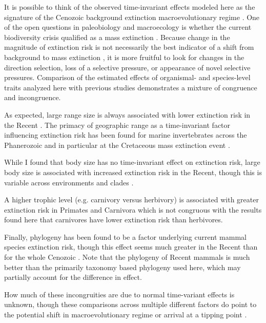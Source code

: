 \documentclass[12pt,letterpaper]{article}
\begin{document}
It is possible to think of the observed time-invariant effects modeled here as the signature of the Cenozoic background extinction macroevolutionary regime \citep{Jablonski1986}. One of the open questions in paleobiology and macroecology is whether the current biodiversity crisis qualified as a mass extinction \citep{Alroy2010,Barnosky2011,Barnosky2012a}. Because change in the magnitude of extinction risk is not necessarily the best indicator of a shift from background to mass extinction \citep{Wang2003}, it is more fruitful to look for changes in the direction selection, loss of a selective pressure, or appearance of novel selective pressures. Comparison of the estimated effects of organismal- and species-level traits analyzed here with previous studies demonstrates a mixture of congruence and incongruence. 

As expected, large range size is always associated with lower extinction risk in the Recent \citep{Fritz2009,Fritz2010b,Liow2009,Purvis2000a}. The primacy of geographic range as a time-invariant factor influencing extinction risk has been found for marine invertebrates across the Phanerozoic and in particular at the Cretaceous mass extinction event \citep{Jablonski1986,Payne2007}.

While I found that body size has no time-invariant effect on extinction risk, large body size is associated with increased extinction risk in the Recent, though this is variable across environments and clades \citep{Liow2009,Fritz2009,Purvis2000a}. 

A higher trophic level (e.g. carnivory versus herbivory) is associated with greater extinction risk in Primates and Carnivora \citep{Purvis2000a} which is not congruous with the results found here that carnivores have lower extinction risk than herbivores. 

Finally, phylogeny has been found to be a factor underlying current mammal species extinction risk, though this effect seems much greater in the Recent than for the whole Cenozoic \citep{Fritz2010b}. Note that the phylogeny of Recent mammals is much better than the primarily taxonomy based phylogeny used here, which may partially account for the difference in effect.

How much of these incongruities are due to normal time-variant effects is unknown, though these comparisons across multiple different factors do point to the potential shift in macroevolutionary regime \citep{Jablonski1986} or arrival at a tipping point \citep{Barnosky2012a,Barnosky2011}.
\end{document}
